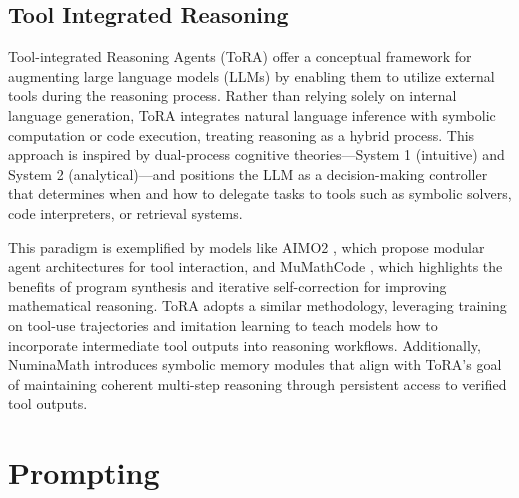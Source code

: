 
\subsection{Tool Integrated Reasoning}

Tool-integrated Reasoning Agents (ToRA) \citep{Gou2024ToRA} offer a conceptual framework for augmenting large language models (LLMs) by enabling them to utilize external tools during the reasoning process. Rather than relying solely on internal language generation, ToRA integrates natural language inference with symbolic computation or code execution, treating reasoning as a hybrid process. This approach is inspired by dual-process cognitive theories—System 1 (intuitive) and System 2 (analytical)—and positions the LLM as a decision-making controller that determines when and how to delegate tasks to tools such as symbolic solvers, code interpreters, or retrieval systems.

This paradigm is exemplified by models like AIMO2 \citep{Moshkov2025AIMO2}, which propose modular agent architectures for tool interaction, and MuMathCode \citep{Yin2024MuMathCode}, which highlights the benefits of program synthesis and iterative self-correction for improving mathematical reasoning. ToRA adopts a similar methodology, leveraging training on tool-use trajectories and imitation learning to teach models how to incorporate intermediate tool outputs into reasoning workflows. Additionally, NuminaMath \citep{Li2024NuminaMath, Fleureau2024NuminaMath} introduces symbolic memory modules that align with ToRA’s goal of maintaining coherent multi-step reasoning through persistent access to verified tool outputs.





\section{Prompting}

